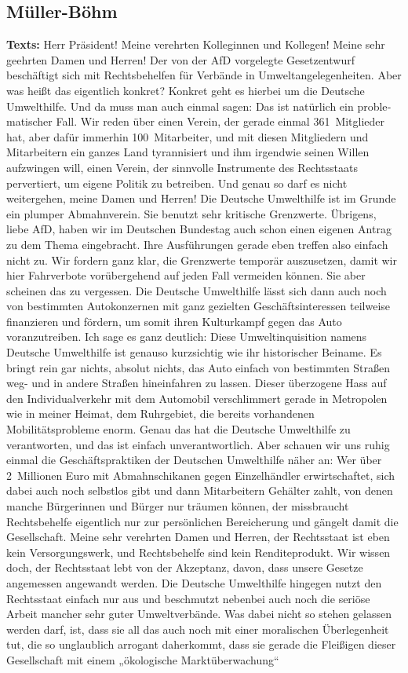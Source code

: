\documentclass{article}
\begin{document}
\subsection{Müller-Böhm}
\noindent\textbf{Texts:} Herr Präsident! Meine verehrten Kolleginnen und Kollegen! Meine sehr geehrten Damen und Herren! Der von der AfD vorgelegte Gesetzentwurf beschäftigt sich mit Rechtsbehelfen für Verbände in Umweltangelegenheiten. Aber was heißt das eigentlich konkret? Konkret geht es hierbei um die Deutsche Umwelthilfe. Und da muss man auch einmal sagen: Das ist natürlich ein proble­matischer Fall. Wir reden über einen Verein, der gerade einmal 361 Mitglieder hat, aber dafür immerhin 100 Mitarbeiter, und mit diesen Mitgliedern und Mitarbeitern ein ganzes Land tyrannisiert und ihm irgendwie seinen Willen aufzwingen will,  einen Verein, der sinnvolle Instrumente des Rechtsstaats pervertiert, um eigene Politik zu betreiben. Und genau so darf es nicht weitergehen, meine Damen und Herren!  Die Deutsche Umwelthilfe ist im Grunde ein plumper Abmahnverein. Sie benutzt sehr kritische Grenzwerte.  Übrigens, liebe AfD, haben wir im Deutschen Bundestag auch schon einen eigenen Antrag zu dem Thema eingebracht. Ihre Ausführungen gerade eben treffen also einfach nicht zu. Wir fordern ganz klar, die Grenzwerte temporär auszusetzen, damit wir hier Fahrverbote vorübergehend auf jeden Fall vermeiden können.  Sie aber scheinen das zu vergessen. Die Deutsche Umwelthilfe lässt sich dann auch noch von bestimmten Autokonzernen mit ganz gezielten Geschäftsinteressen teilweise finanzieren und fördern,  um somit ihren Kulturkampf gegen das Auto voranzutreiben. Ich sage es ganz deutlich: Diese Umweltinquisition namens Deutsche Umwelthilfe ist genauso kurzsichtig wie ihr historischer Beiname. Es bringt rein gar nichts, absolut nichts, das Auto einfach von bestimmten Straßen weg- und in andere Straßen hineinfahren zu lassen. Dieser überzogene Hass auf den Individualverkehr mit dem Automobil verschlimmert gerade in Metropolen wie in meiner Heimat, dem Ruhrgebiet, die bereits vorhandenen Mobilitätsprobleme enorm. Genau das hat die Deutsche Umwelthilfe zu verantworten, und das ist einfach unverantwortlich.  Aber schauen wir uns ruhig einmal die Geschäftspraktiken der Deutschen Umwelthilfe näher an: Wer über 2 Millionen Euro mit Abmahnschikanen gegen Einzelhändler erwirtschaftet, sich dabei auch noch selbstlos gibt und dann Mitarbeitern Gehälter zahlt, von denen manche Bürgerinnen und Bürger nur träumen können, der missbraucht Rechtsbehelfe eigentlich nur zur persönlichen Bereicherung und gängelt damit die Gesellschaft. Meine sehr verehrten Damen und Herren, der Rechtsstaat ist eben kein Versorgungswerk, und Rechtsbehelfe sind kein Renditeprodukt.  Wir wissen doch, der Rechtsstaat lebt von der Akzeptanz, davon, dass unsere Gesetze angemessen angewandt werden. Die Deutsche Umwelthilfe hingegen nutzt den Rechtsstaat einfach nur aus und beschmutzt nebenbei auch noch die seriöse Arbeit mancher sehr guter Umweltverbände.  Was dabei nicht so stehen gelassen werden darf, ist, dass sie all das auch noch mit einer moralischen Überlegenheit tut, die so unglaublich arrogant daherkommt, dass sie gerade die Fleißigen dieser Gesellschaft mit einem „ökologische Marktüberwachung“ 
\end{document}
